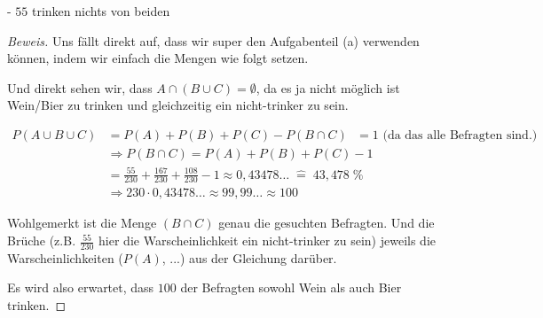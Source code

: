 \documentclass[10pt]{article}
\begin{document}
- $55$ trinken nichts von beiden
\begin{proof}[Beweis]
Uns fällt direkt auf, dass wir super den Aufgabenteil (a) verwenden können, indem wir einfach die Mengen wie folgt setzen.

\indent {}

\indent {}

\indent {}

Und direkt sehen wir, dass $A \cap (B \cup C) = \emptyset$, da es ja nicht möglich ist Wein/Bier zu trinken und gleichzeitig ein nicht-trinker zu sein.

\begin{align*}
P(A \cup B \cup C) &= P(A) + P(B) + P(C) - P(B \cap C) \text{ $= 1$ (da das alle Befragten sind.)} \\
&\Rightarrow P(B \cap C) = P(A) + P(B) + P(C) - 1 \\
&= \frac{55}{230} + \frac{167}{230} + \frac{108}{230} - 1 \approx 0,43478 \ldots \; \hat{=}\; 43,478 \; \% \\
&\Rightarrow 230 \cdot 0,43478 \ldots \approx 99,99\ldots \approx 100
\end{align*}

Wohlgemerkt ist die Menge $(B \cap C)$ genau die gesuchten Befragten. Und die Brüche (z.B. $\frac{55}{230}$ hier die Warscheinlichkeit ein nicht-trinker zu sein) jeweils die Warscheinlichkeiten ($P(A)$, ...) aus der Gleichung darüber.

Es wird also erwartet, dass $100$ der Befragten sowohl Wein als auch Bier trinken.
\end{proof}
\end{document}

